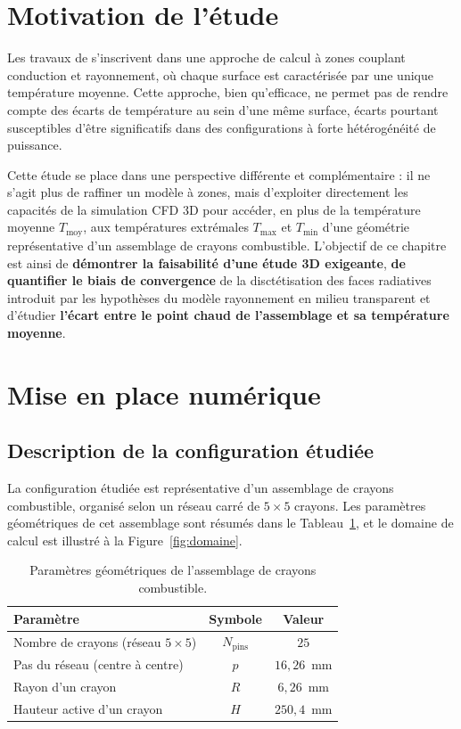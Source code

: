 \section{Motivation de l'étude}

Les travaux de \cite{romain25} s'inscrivent dans une approche de calcul à zones couplant conduction et rayonnement, où chaque surface est caractérisée par une unique température moyenne. Cette approche, bien qu'efficace, ne permet pas de rendre compte des écarts de température au sein d'une même surface, écarts pourtant susceptibles d'être significatifs dans des configurations à forte hétérogénéité de puissance.

Cette étude se place dans une perspective différente et complémentaire : il ne s'agit plus de raffiner un modèle à zones, mais d'exploiter directement les capacités de la simulation CFD 3D pour accéder, en plus de la température moyenne $T_{\mathrm{moy}}$, aux températures extrémales $T_{\mathrm{max}}$ et $T_{\mathrm{min}}$ d'une géométrie représentative d'un assemblage de crayons combustible. L'objectif de ce chapitre est ainsi de \textbf{démontrer la faisabilité d'une étude 3D exigeante}, \textbf{de quantifier le biais de convergence} de la disctétisation des faces radiatives introduit par les hypothèses du modèle rayonnement en milieu transparent et d'étudier \textbf{l'écart entre le point chaud de  l'assemblage et sa température moyenne}.


\section{Mise en place numérique}

\subsection{Description de la configuration étudiée}

La configuration étudiée est représentative d'un assemblage de crayons combustible, organisé selon un réseau carré de $5\times5$ crayons. Les paramètres géométriques de cet assemblage sont résumés dans le Tableau~\ref{tab:geom_assemblage}, et le domaine de calcul est illustré à la Figure~\ref{fig:domaine}.

\begin{table}[H]
\centering
\renewcommand{\arraystretch}{1.0}
\begin{tabular}{lcc}
\toprule
Paramètre & Symbole & Valeur \\
\midrule
Nombre de crayons (réseau $5\times5$) & $N_{\mathrm{pins}}$ & $25$ \\
Pas du réseau (centre à centre)& $p$ & $16{,}26$~mm \\
Rayon d'un crayon & $R$ & $6{,}26$~mm \\
Hauteur active d'un crayon & $H$ & $250{,}4$~mm \\
\bottomrule
\end{tabular}
\caption{Paramètres géométriques de l'assemblage de crayons combustible.}
\label{tab:geom_assemblage}
\end{table}

